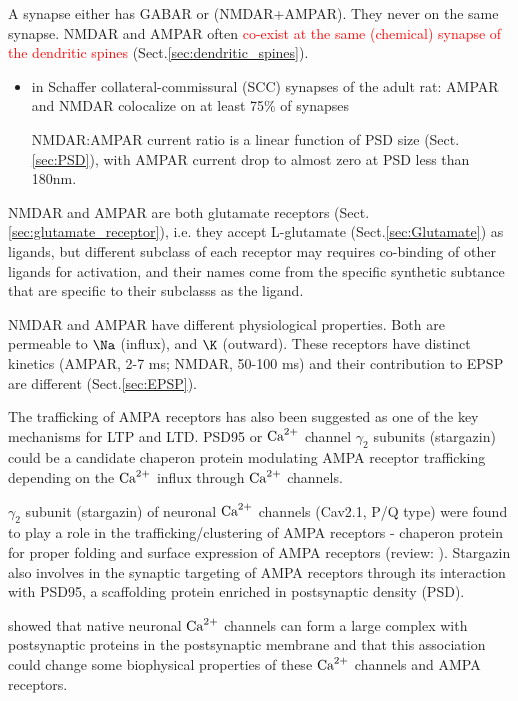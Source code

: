 A synapse either has GABAR or (NMDAR+AMPAR). They never on the same synapse.
NMDAR and AMPAR often \textcolor{red}{co-exist at the same (chemical) synapse of
the dendritic spines} (Sect.\ref{sec:dendritic_spines}). 

\begin{itemize}
  \item in Schaffer collateral-commissural (SCC) synapses of the adult rat:
  AMPAR and NMDAR colocalize on at least 75\% of synapses
  
  NMDAR:AMPAR current ratio is a linear function of PSD size
  (Sect.\ref{sec:PSD}), with AMPAR current drop to almost zero at PSD less than
  180nm. 
  
\end{itemize}

NMDAR and AMPAR are both glutamate receptors
(Sect.\ref{sec:glutamate_receptor}), i.e. they accept L-glutamate
(Sect.\ref{sec:Glutamate}) as ligands, but different subclass of each receptor
may requires co-binding of other ligands for activation, and their names come
from the specific synthetic subtance that are specific to their subclasss as the
ligand.

NMDAR and AMPAR have different physiological properties. Both are permeable to
$\Na$ (influx), and $\K$ (outward). These receptors have distinct kinetics
(AMPAR, 2-7 ms; NMDAR, 50-100 ms) and their contribution to EPSP are different
(Sect.\ref{sec:EPSP}).


The trafficking of AMPA receptors has also been suggested as one of the key
mechanisms for LTP and LTD. PSD95 or ${\text{Ca}^{2+}}$ channel $\gamma_2$ subunits
(stargazin) could be a candidate chaperon protein modulating AMPA receptor
trafficking depending on the ${\text{Ca}^{2+}}$ influx through ${\text{Ca}^{2+}}$ channels.

$\gamma_2$ subunit (stargazin) of neuronal ${\text{Ca}^{2+}}$ channels (Cav2.1, P/Q type)
were found to play a role in  the trafficking/clustering of AMPA receptors -
chaperon protein for proper folding and surface expression of AMPA receptors
(review: \citep{kang2006}). Stargazin also involves in the synaptic targeting of
AMPA receptors through its interaction with PSD95, a scaffolding protein
enriched in postsynaptic density (PSD).

\citep{kang2006} showed that native neuronal ${\text{Ca}^{2+}}$ channels can form a large
complex with postsynaptic proteins in the postsynaptic membrane and that this
association could change some biophysical properties of these ${\text{Ca}^{2+}}$ channels and
AMPA receptors.


